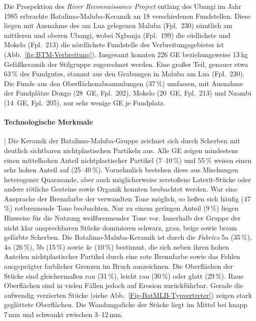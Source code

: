 Die Prospektion des \textit{River Reconnaissance Project} entlang des \mbox{Ubangi} im Jahr 1985 erbrachte Batalimo-Maluba-Keramik an 18 verschiedenen Fundstellen. Diese liegen mit Ausnahme des am Lua gelegenen Maluba (Fpl.~230) sämtlich am mittleren und oberen \mbox{Ubangi}, wobei \mbox{Ngbanja} (Fpl.~199) die südlichste und Mokelo (Fpl.~213) die nördlichste Fundstelle des Verbreitungsgebietes ist (Abb.~\ref{fig:BTM-Verbreitung}). Insgesamt konnten 226 GE beziehungsweise 13\,kg Gefäßkeramik der Stilgruppe zugerechnet werden. Eine großer Teil, genauer etwa 63\,\% des Fundgutes, stammt aus den Grabungen in Maluba am Lua (Fpl.~230). Die Funde aus den Oberflächenabsammlungen (37\,\%) umfassen, mit Ausnahme der Fundplätze Dongo (28~GE, Fpl.~202), Mokelo (20~GE, Fpl.~213) und Nzambi (14~GE, Fpl.~205), nur sehr wenige GE je Fundplatz.

\paragraph{Technologische Merkmale}\hspace{-.5em}|\hspace{.5em}%
Die Keramik der Batalimo-Maluba-Gruppe zeichnet sich durch Scherben mit deutlich sichtbaren nichtplastischen Partikeln aus. Alle GE zeigen mindestens einen mittelhohen Anteil nichtplastischer Partikel (7--10\,\%) und 55\,\% weisen einen sehr hohen Anteil auf (25--40\,\%). Vornehmlich bestehen diese aus Mischungen heterogener Quarzsande, aber auch möglicherweise zerstoßene Laterit-Stücke oder andere rötliche Gesteine sowie Organik konnten beobachtet werden. War eine Ansprache der Brennfarbe der verwandten Tone möglich, so ließen sich häufig (47\,\%) rotbrennende Tone beobachten. Nur zu einem geringen Anteil (9\,\%) liegen Hinweise für die Nutzung weißbrennender Tone vor. Innerhalb der Gruppe der nicht klar ansprechbaren Stücke dominieren schwarz, grau, beige sowie braun gefärbte Scherben. Die Batalimo-Maluba-Keramik ist durch die \textit{Fabrics} 5a (35\,\%), 4a (26\,\%), 5b (15\,\%) sowie 4c (10\,\%) bestimmt, die sich neben ihren hohen Anteilen nichtplastischer Partikel durch eine rote Brennfarbe sowie das Fehlen ausgeprägter farblicher Grenzen im Bruch auszeichnen. Die Oberflächen der Stücke sind gleichermaßen rau (31\,\%), leicht rau (30\,\%) oder glatt (29\,\%). Raue Oberflächen sind in vielen Fällen jedoch auf Erosion zurückführbar. Gerade die aufwendig verzierten Stücke (siehe Abb.~\ref{Fig-BatMLB-Typvertreter}) zeigen stark geglättete Oberflächen. Die Wandungsdicke der Stücke liegt im Mittel bei knapp 7\,mm und schwankt zwischen 3--12\,mm.

